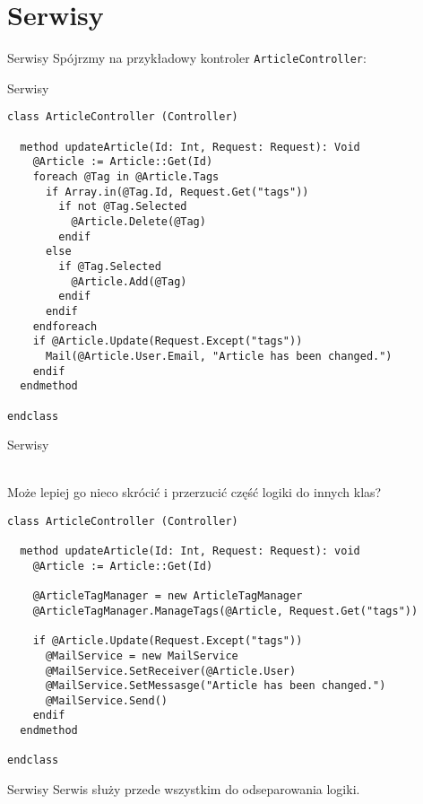 \section{Serwisy}

\begin{frame}{Serwisy}
	Spójrzmy na przykładowy kontroler \texttt{ArticleController}:
\end{frame}

\begin{frame}[fragile]{Serwisy}
	\begin{lstlisting}
class ArticleController (Controller)

  method updateArticle(Id: Int, Request: Request): Void
    @Article := Article::Get(Id)
    foreach @Tag in @Article.Tags
      if Array.in(@Tag.Id, Request.Get("tags"))
        if not @Tag.Selected
          @Article.Delete(@Tag)
        endif
      else
        if @Tag.Selected
          @Article.Add(@Tag)
        endif
      endif
    endforeach
    if @Article.Update(Request.Except("tags"))
      Mail(@Article.User.Email, "Article has been changed.")
    endif
  endmethod
  
endclass
	\end{lstlisting}
\end{frame}

\begin{frame}[fragile]{Serwisy}

	\ \\
	
	Może lepiej go nieco skrócić i przerzucić część logiki do innych klas?

	\begin{lstlisting}
class ArticleController (Controller)

  method updateArticle(Id: Int, Request: Request): void
    @Article := Article::Get(Id)

    @ArticleTagManager = new ArticleTagManager
    @ArticleTagManager.ManageTags(@Article, Request.Get("tags"))

    if @Article.Update(Request.Except("tags"))
      @MailService = new MailService
      @MailService.SetReceiver(@Article.User)
      @MailService.SetMessasge("Article has been changed.")
      @MailService.Send()
    endif
  endmethod

endclass
	\end{lstlisting}
\end{frame}

\begin{frame}{Serwisy}
	Serwis służy przede wszystkim do odseparowania logiki.
\end{frame}

